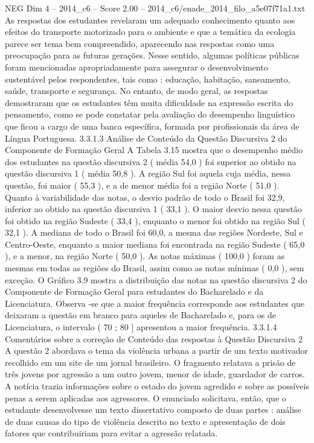 \begin{textsample}{NEG Dim 4 – 2014\_c6 – Score 2.00 – 2014\_c6/enade\_2014\_filo\_a5e07f71a1.txt}
As respostas dos estudantes revelaram um adequado conhecimento quanto aos efeitos do transporte motorizado para o ambiente e que a temática da ecologia parece ser tema bem compreendido, aparecendo nas respostas como uma preocupação para as futuras gerações.
Nesse sentido, algumas políticas públicas foram mencionadas apropriadamente para assegurar o desenvolvimento sustentável pelos respondentes, tais como : educação, habitação, saneamento, saúde, transporte e segurança.
No entanto, de modo geral, as respostas demostraram que os estudantes têm muita dificuldade na expressão escrita do pensamento, como se pode constatar pela avaliação do desempenho linguístico que ficou a cargo de uma banca específica, formada por profissionais da área de Língua Portuguesa. 3.3.1.3 Análise de Conteúdo da Questão Discursiva 2 do Componente de Formação Geral A Tabela 3.15 mostra que o desempenho médio dos estudantes na questão discursiva 2 ( média 54,0 ) foi superior ao obtido na questão discursiva 1 ( média 50,8 ).
A região Sul foi aquela cuja média, nessa questão, foi maior ( 55,3 ), e a de menor média foi a região Norte ( 51,0 ).
Quanto à variabilidade das notas, o desvio padrão de todo o Brasil foi 32,9, inferior ao obtido na questão discursiva 1 ( 33,1 ).
O maior desvio nessa questão foi obtido na região Sudeste ( 33,4 ), enquanto o menor foi obtido na região Sul ( 32,1 ).
A mediana de todo o Brasil foi 60,0, a mesma das regiões Nordeste, Sul e Centro-Oeste, enquanto a maior mediana foi encontrada na região Sudeste ( 65,0 ), e a menor, na região Norte ( 50,0 ).
As notas máximas ( 100,0 ) foram as mesmas em todas as regiões do Brasil, assim como as notas mínimas ( 0,0 ), sem exceção.
O Gráfico 3.9 mostra a distribuição das notas na questão discursiva 2 do Componente de Formação Geral para estudantes do Bacharelado e da Licenciatura.
Observa -se que a maior frequência corresponde aos estudantes que deixaram a questão em branco para aqueles de Bacharelado e, para os de Licenciatura, o intervalo ( 70 ; 80 ] apresentou a maior frequência. 3.3.1.4 Comentários sobre a correção de Conteúdo das respostas à Questão Discursiva 2 A questão 2 abordava o tema da violência urbana a partir de um texto motivador recolhido em um site de um jornal brasileiro.
O fragmento relatava a prisão de três jovens por agressão a um outro jovem, menor de idade, guardador de carros.
A notícia trazia informações sobre o estado do jovem agredido e sobre as possíveis penas a serem aplicadas aos agressores.
O enunciado solicitava, então, que o estudante desenvolvesse um texto dissertativo composto de duas partes : análise de duas causas do tipo de violência descrito no texto e apresentação de dois fatores que contribuiriam para evitar a agressão relatada.

\end{textsample}
